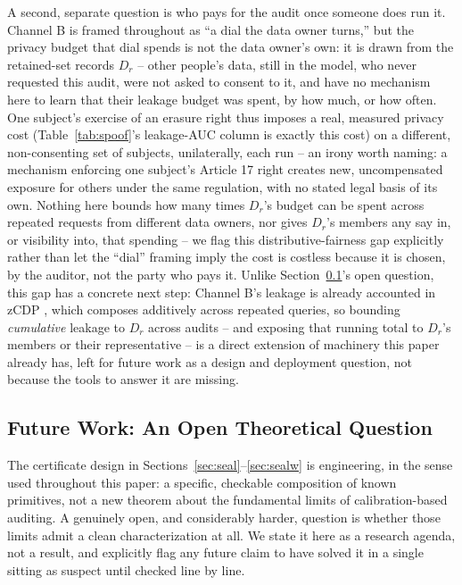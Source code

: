 \documentclass[10pt,journal,compsoc]{IEEEtran}
\begin{document}
A second, separate question is who pays for the audit once someone does run it. Channel B is framed throughout as ``a dial the data owner turns,'' but the privacy budget that dial spends is not the data owner's own: it is drawn from the retained-set records $D_r$ -- other people's data, still in the model, who never requested this audit, were not asked to consent to it, and have no mechanism here to learn that their leakage budget was spent, by how much, or how often. One subject's exercise of an erasure right thus imposes a real, measured privacy cost (Table~\ref{tab:spoof}'s leakage-AUC column is exactly this cost) on a different, non-consenting set of subjects, unilaterally, each run -- an irony worth naming: a mechanism enforcing one subject's Article 17 right creates new, uncompensated exposure for others under the same regulation, with no stated legal basis of its own. Nothing here bounds how many times $D_r$'s budget can be spent across repeated requests from different data owners, nor gives $D_r$'s members any say in, or visibility into, that spending -- we flag this distributive-fairness gap explicitly rather than let the ``dial'' framing imply the cost is costless because it is chosen, by the auditor, not the party who pays it. Unlike Section~\ref{sec:futurework}'s open question, this gap has a concrete next step: Channel B's leakage is already accounted in zCDP \cite{bun2016concentrated}, which composes additively across repeated queries, so bounding \emph{cumulative} leakage to $D_r$ across audits -- and exposing that running total to $D_r$'s members or their representative -- is a direct extension of machinery this paper already has, left for future work as a design and deployment question, not because the tools to answer it are missing.

\subsection{Future Work: An Open Theoretical Question}
\label{sec:futurework}

The certificate design in Sections~\ref{sec:seal}--\ref{sec:sealw} is engineering, in the sense used throughout this paper: a specific, checkable composition of known primitives, not a new theorem about the fundamental limits of calibration-based auditing. A genuinely open, and considerably harder, question is whether those limits admit a clean characterization at all. We state it here as a research agenda, not a result, and explicitly flag any future claim to have solved it in a single sitting as suspect until checked line by line.
\end{document}
